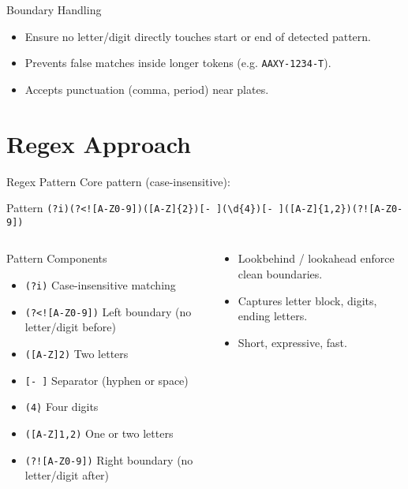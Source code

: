 \documentclass[aspectratio=169]{beamer}
\newcommand{\code}[1]{\texttt{#1}}
\begin{document}
\begin{frame}{Boundary Handling}
  \begin{itemize}
    \item Ensure no letter/digit directly touches start or end of detected pattern.
    \item Prevents false matches inside longer tokens (e.g. \code{AAXY-1234-T}).
    \item Accepts punctuation (comma, period) near plates.
  \end{itemize}
\end{frame}


\section{Regex Approach}

\begin{frame}[fragile]{Regex Pattern}
  Core pattern (case-insensitive):
  \begin{block}{Pattern}
  \small\verb|(?i)(?<![A-Z0-9])([A-Z]{2})[- ](\d{4})[- ]([A-Z]{1,2})(?![A-Z0-9])|
  \end{block}
  \begin{columns}[T,totalwidth=\textwidth]
      \begin{column}{0.65\textwidth}
        \begin{block}{Pattern Components}
          \small
          \begin{itemize}
            \item \texttt{(?i)} Case-insensitive matching
            \item \texttt{(?<![A-Z0-9])} Left boundary (no letter/digit before)
            \item \texttt{([A-Z]{2})} Two letters
            \item \texttt{[- ]} Separator (hyphen or space)
            \item \texttt{(\d{4})} Four digits
            \item \texttt{([A-Z]{1,2})} One or two letters
            \item \texttt{(?![A-Z0-9])} Right boundary (no letter/digit after)
          \end{itemize}
        \end{block}
    \end{column}
    \begin{column}{0.35\textwidth}
      \begin{itemize}
        \vspace{2em}

        \item Lookbehind / lookahead enforce clean boundaries.
        \item Captures letter block, digits, ending letters.
        \item Short, expressive, fast.
      \end{itemize}
    \end{column}
  \end{columns}
\end{frame}
\end{document}
